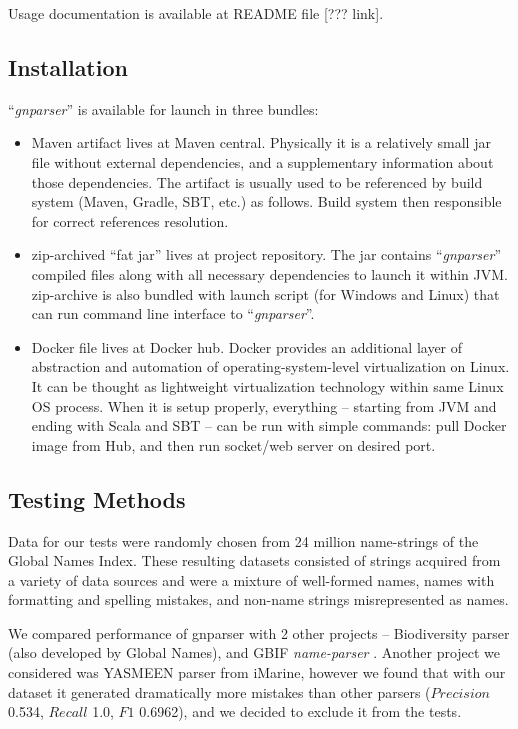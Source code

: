 \documentclass{bmcart}
\begin{document}
Usage documentation is available at README file [??? link].

\subsection*{Installation}

``\textit{gnparser}'' is available for launch in three bundles:

\begin{itemize}
  \item Maven artifact lives at Maven central. Physically it is a relatively
  small jar file without external dependencies, and a supplementary
  information about those dependencies. The artifact is usually used to be
  referenced by build system (Maven, Gradle, SBT, etc.) as follows. Build
  system then responsible for correct references resolution.
  \item zip-archived ``fat jar'' lives at project repository. The jar contains
  ``\textit{gnparser}'' compiled files along with all necessary dependencies
  to launch it within JVM. zip-archive is also bundled with launch script (for
  Windows and Linux) that can run command line interface to
  ``\textit{gnparser}''.
  \item Docker file lives at Docker hub. Docker provides an additional layer
  of abstraction and automation of operating-system-level virtualization on
  Linux. It can be thought as lightweight virtualization technology within
  same Linux OS process. When it is setup properly, everything -- starting
  from JVM and ending with Scala and SBT -- can be run with simple commands:
  pull Docker image from Hub, and then run socket/web server on desired port.
\end{itemize}

\subsection*{Testing Methods}

Data for our tests were randomly chosen from 24 million name-strings of the
Global Names Index. These resulting datasets consisted of strings acquired
from a variety of data sources and were a mixture of well-formed names, names
with formatting and spelling mistakes, and non-name strings misrepresented as
names.

We compared performance of gnparser with 2 other projects -- Biodiversity
parser\cite{biodiversity} (also developed by Global Names), and GBIF
\textit{name-parser} \cite{gbifNameParser}. Another project we considered was
YASMEEN parser from iMarine\cite{VandenBerghe2015}, however we found that with
our dataset it generated dramatically more mistakes than other parsers
($Precision$ 0.534, $Recall$ 1.0, $F1$ 0.6962), and we decided to exclude it
from the tests.
\end{document}

